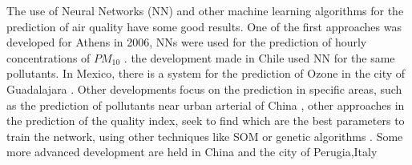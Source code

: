 The use of Neural Networks (NN) and other machine learning algorithms for the prediction of 
air quality have some good results.  One of the first approaches was developed
for Athens in 2006, NNs were used for the prediction of hourly concentrations of
$PM_{10}$ \cite{grivas_artificial_2006}.  the development made 
in Chile \cite{perez_integrated_2006} 
used NN for the same pollutants. 
In Mexico, there is a system for the prediction of Ozone in the 
city of Guadalajara \cite{ignacio_garcia_pronostico_nodate}.
Other developments focus on the prediction in specific areas, such as the prediction of 
pollutants near urban arterial of China \cite{cai_prediction_2009}, other approaches in the 
prediction of the quality index, seek to find which are the best parameters to train the 
network, using other techniques like SOM \cite{kolehmainen_neural_2001} or genetic algorithms 
\cite{niska_evolving_2004}.
Some more advanced development are held in China \cite{jiang_progress_2004} and the city of 
Perugia,Italy \cite{viotti_atmospheric_2002}


